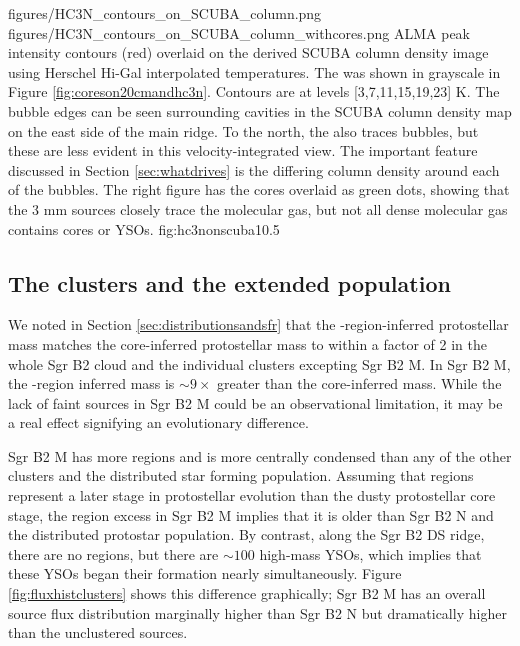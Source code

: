 \documentclass[twocolumn]{aastex61}
\begin{document}
\FigureTwo
{figures/HC3N_contours_on_SCUBA_column.png}
{figures/HC3N_contours_on_SCUBA_column_withcores.png}
{ALMA \cyanoacetylene peak intensity contours (red) overlaid on the derived SCUBA
column density
image using Herschel Hi-Gal interpolated temperatures. The \cyanoacetylene was
shown in grayscale in Figure \ref{fig:coreson20cmandhc3n}.
Contours are at levels [3,7,11,15,19,23] K.  The  \cyanoacetylene bubble edges can be
seen surrounding cavities in the SCUBA column density map on the east side of
the main ridge.  To the north, the \cyanoacetylene also traces bubbles, but these are
less evident in this velocity-integrated view.  The important feature discussed
in Section \ref{sec:whatdrives} is the differing column density around each of
the bubbles.  The right figure has the cores overlaid as green dots,
showing that the 3 mm sources closely trace the molecular gas, but not all
dense molecular gas contains cores or YSOs.}
{fig:hc3nonscuba}{1}{0.5\textwidth}

\subsection{The clusters and the extended population}
\label{sec:clustersandextended}
We noted in Section \ref{sec:distributionsandsfr} that the \hii-region-inferred
protostellar mass matches the core-inferred protostellar mass to within a
factor of 2 in the whole Sgr B2 cloud and the individual clusters excepting Sgr
B2 M.  In Sgr B2 M, the \hii-region inferred mass is $\sim9\times$ greater than
the core-inferred mass.  While the lack of faint sources in Sgr B2 M could
be an observational limitation, it may be a real effect signifying an evolutionary
difference.

Sgr B2 M has more \hii regions and is more centrally condensed than any of the
other clusters and the distributed star forming population.  Assuming that \hii
regions represent a later stage in protostellar evolution than the dusty
protostellar core stage, the \hii region excess in Sgr B2 M implies that it is
older than Sgr B2 N and the distributed protostar population.  By contrast,
along the Sgr B2 DS ridge, there are no \hii regions, but there are $\sim100$
high-mass YSOs, which implies that these YSOs began their formation
nearly simultaneously.  Figure \ref{fig:fluxhistclusters} shows this difference
graphically; Sgr B2 M has an overall source flux distribution marginally higher
than Sgr B2 N but dramatically higher than the unclustered sources.
\end{document}
